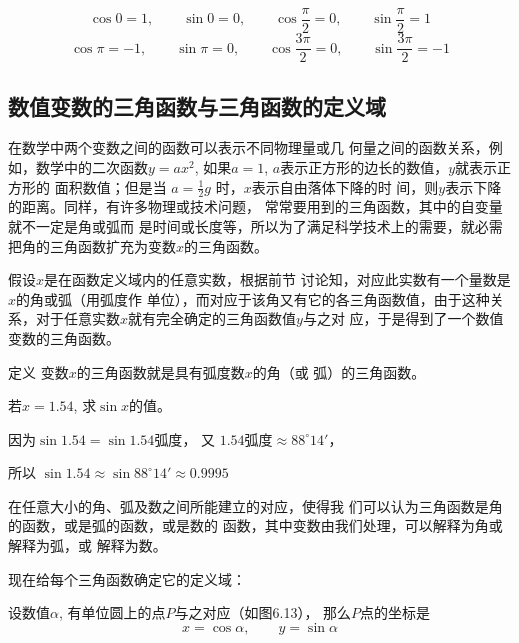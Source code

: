 \begin{example}
    $$\cos 0=1,\qquad \sin 0=0,\qquad \cos\frac{\pi}{2}=0,\qquad \sin\frac{\pi}{2}=1$$
    \[\cos\pi=-1,\qquad \sin\pi=0,\qquad \cos\frac{3\pi}{2}=0,\qquad \sin\frac{3\pi}{2}=-1\]
\end{example}

\subsection{数值变数的三角函数与三角函数的定义域}
在数学中两个变数之间的函数可以表示不同物理量或几
何量之间的函数关系，例如，数学中的二次函数$y=ax^2$,
如果$a=1$, $a$表示正方形的边长的数值，$y$就表示正方形的
面积数值；但是当
$a=\frac{1}{2}g$
时，$x$表示自由落体下降的时
间，则$y$表示下降的距离。同样，有许多物理或技术问题，
常常要用到的三角函数，其中的自变量就不一定是角或弧而
是时间或长度等，所以为了满足科学技术上的需要，就必需
把角的三角函数扩充为变数$x$的三角函数。

假设$x$是在函数定义域内的任意实数，根据前节
讨论知，对应此实数有一个量数是$x$的角或弧（用弧度作
单位），而对应于该角又有它的各三角函数值，由于这种关
系，对于任意实数$x$就有完全确定的三角函数值$y$与之对
应，于是得到了一个数值变数的三角函数。

\begin{blk}{定义}
 变数$x$的三角函数就是具有弧度数$x$的角（或
弧）的三角函数。    
\end{blk}


\begin{example}
    若$x=1.54$, 求$\sin x$的值。
\end{example}

\begin{solution}
    因为$\sin1.54=\sin1.54\text{弧度}$，
又 $1.54\text{弧度}\approx 88^{\circ}14'$，

所以
$\sin1.54\approx \sin88^{\circ}14'\approx 0.9995$
\end{solution}

在任意大小的角、弧及数之间所能建立的对应，使得我
们可以认为三角函数是角的函数，或是弧的函数，或是数的
函数，其中变数由我们处理，可以解释为角或解释为弧，或
解释为数。

现在给每个三角函数确定它的定义域：

设数值$\alpha$, 有单位圆上的点$P$与之对应（如图6.13），
那么$P$点的坐标是
\[x=\cos\alpha,\qquad y=\sin\alpha\]

\begin{figure}[htp]
    \centering
{}
    \caption{}
\end{figure}


